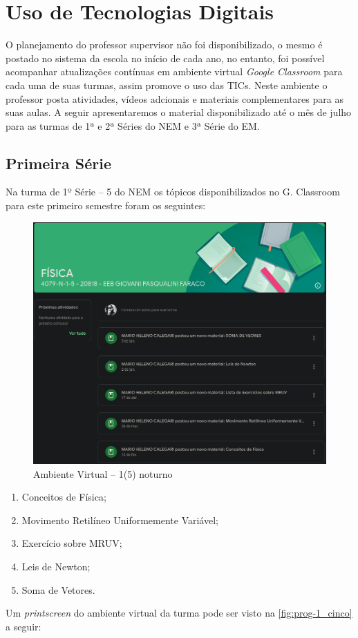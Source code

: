 \chapter{Uso de Tecnologias Digitais} %
\label{chap:Conteúdo Programático}
O planejamento do professor supervisor não foi disponibilizado, o mesmo é postado no sistema da escola no início de cada ano, no entanto, foi possível acompanhar atualizações contínuas em ambiente virtual \textit{Google Classroom} para cada uma de suas turmas, assim promove o uso das \ac{TICs}. Neste ambiente o professor posta atividades, vídeos adcionais e materiais complementares para as suas aulas. A seguir apresentaremos o material disponibilizado até o mês de julho para as turmas de 1ª e 2ª Séries do \ac{NEM} e 3ª Série do \ac{EM}.

\section{Primeira Série} %
Na turma de 1º Série -- 5 do \ac{NEM} os tópicos disponibilizados no G. Classroom para este primeiro semestre foram os seguintes:
\vspace{10pt}

\begin{figure}[!ht]
	\centering
	\caption{Ambiente Virtual -- 1(5) noturno}
	\label{fig:prog-1_cinco}
	\includegraphics[width=.8\textwidth]{assets/conteudo_programatico-1.png}
\end{figure}

\begin{enumerate}
	\item Conceitos de Física;
	\item Movimento Retilíneo Uniformemente Variável;
	\item Exercício sobre MRUV;
	\item Leis de Newton;
	\item Soma de Vetores.
\end{enumerate}
Um \textit{printscreen} do ambiente virtual da turma pode ser visto na \autoref{fig:prog-1_cinco} a seguir:


